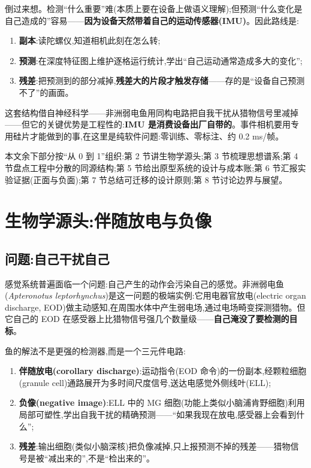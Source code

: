 \documentclass[UTF8,12pt,a4paper]{ctexart}
\begin{document}
倒过来想。检测``什么重要''难(本质上要在设备上做语义理解);但预测``什么变化是自己造成的''容易——\textbf{因为设备天然带着自己的运动传感器(IMU)}。因此路线是:

\begin{enumerate}
  \item \textbf{副本}:读陀螺仪,知道相机此刻在怎么转;
  \item \textbf{预测}:在深度特征图上维护逐格运行统计,学出``自己运动通常造成多大的变化'';
  \item \textbf{残差}:把预测到的部分减掉,\textbf{残差大的片段才触发存储}——存的是``设备自己预测不了''的画面。
\end{enumerate}

这套结构借自神经科学——非洲弱电鱼用同构电路把自我干扰从猎物信号里减掉——但它的关键优势是工程性的:\textbf{IMU 是消费设备出厂自带的}。事件相机要用专用硅片才能做到的事,在这里是纯软件问题:零训练、零标注、约 0.2 ms/帧。

本文余下部分按``从 0 到 1''组织:第 2 节讲生物学源头;第 3 节梳理思想谱系;第 4 节盘点工程中分散的同源结构;第 5 节给出原型系统的设计与成本账;第 6 节汇报实验证据(正面与负面);第 7 节总结可迁移的设计原则;第 8 节讨论边界与展望。

\section{生物学源头:伴随放电与负像}

\subsection{问题:自己干扰自己}

感觉系统普遍面临一个问题:自己产生的动作会污染自己的感觉。非洲弱电鱼(\emph{Apteronotus leptorhynchus})是这一问题的极端实例:它用电器官放电(electric organ discharge, EOD)做主动感知,在周围水体中产生弱电场,通过电场畸变探测猎物。但它自己的 EOD 在感受器上比猎物信号强几个数量级——\textbf{自己淹没了要检测的目标}。

鱼的解法不是更强的检测器,而是一个三元件电路\cite{bell1981,bastian1986}:

\begin{enumerate}
  \item \textbf{伴随放电(corollary discharge)}:运动指令(EOD 命令)的一份副本,经颗粒细胞(granule cell)通路展开为多时间尺度信号,送达电感觉外侧线叶(ELL);
  \item \textbf{负像(negative image)}:ELL 中的 MG 细胞(功能上类似小脑浦肯野细胞)利用局部可塑性,学出自我干扰的精确预测——``如果我现在放电,感受器上会看到什么'';
  \item \textbf{残差}:输出细胞(类似小脑深核)把负像减掉,只上报预测不掉的残差——猎物信号是被``减出来的'',不是``检出来的''。
\end{enumerate}
\end{document}
